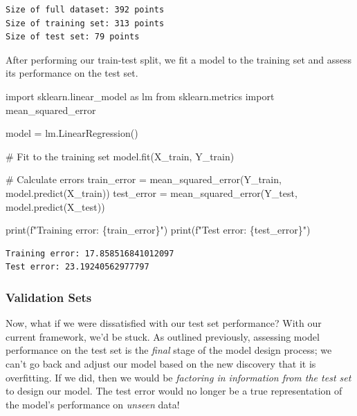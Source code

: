 \documentclass[
  letterpaper,
  DIV=11,
  numbers=noendperiod]{scrreprt}
\newenvironment{Shaded}{\begin{snugshade}}{\end{snugshade}}
\newcommand{\BuiltInTok}[1]{\textcolor[rgb]{0.00,0.23,0.31}{#1}}
\newcommand{\CommentTok}[1]{\textcolor[rgb]{0.37,0.37,0.37}{#1}}
\newcommand{\ImportTok}[1]{\textcolor[rgb]{0.00,0.46,0.62}{#1}}
\newcommand{\NormalTok}[1]{\textcolor[rgb]{0.00,0.23,0.31}{#1}}
\newcommand{\OperatorTok}[1]{\textcolor[rgb]{0.37,0.37,0.37}{#1}}
\newcommand{\SpecialCharTok}[1]{\textcolor[rgb]{0.37,0.37,0.37}{#1}}
\newcommand{\SpecialStringTok}[1]{\textcolor[rgb]{0.13,0.47,0.30}{#1}}
\begin{document}
\begin{verbatim}
Size of full dataset: 392 points
Size of training set: 313 points
Size of test set: 79 points
\end{verbatim}

After performing our train-test split, we fit a model to the training
set and assess its performance on the test set.

\begin{Shaded}
\begin{Highlighting}[]
\ImportTok{import}\NormalTok{ sklearn.linear\_model }\ImportTok{as}\NormalTok{ lm}
\ImportTok{from}\NormalTok{ sklearn.metrics }\ImportTok{import}\NormalTok{ mean\_squared\_error}

\NormalTok{model }\OperatorTok{=}\NormalTok{ lm.LinearRegression()}

\CommentTok{\# Fit to the training set}
\NormalTok{model.fit(X\_train, Y\_train)}

\CommentTok{\# Calculate errors}
\NormalTok{train\_error }\OperatorTok{=}\NormalTok{ mean\_squared\_error(Y\_train, model.predict(X\_train))}
\NormalTok{test\_error }\OperatorTok{=}\NormalTok{ mean\_squared\_error(Y\_test, model.predict(X\_test))}

\BuiltInTok{print}\NormalTok{(}\SpecialStringTok{f"Training error: }\SpecialCharTok{\{}\NormalTok{train\_error}\SpecialCharTok{\}}\SpecialStringTok{"}\NormalTok{)}
\BuiltInTok{print}\NormalTok{(}\SpecialStringTok{f"Test error: }\SpecialCharTok{\{}\NormalTok{test\_error}\SpecialCharTok{\}}\SpecialStringTok{"}\NormalTok{)}
\end{Highlighting}
\end{Shaded}

\begin{verbatim}
Training error: 17.858516841012097
Test error: 23.19240562977797
\end{verbatim}

\subsubsection{Validation Sets}\label{validation-sets}

Now, what if we were dissatisfied with our test set performance? With
our current framework, we'd be stuck. As outlined previously, assessing
model performance on the test set is the \emph{final} stage of the model
design process; we can't go back and adjust our model based on the new
discovery that it is overfitting. If we did, then we would be
\emph{factoring in information from the test set} to design our model.
The test error would no longer be a true representation of the model's
performance on \emph{unseen} data!
\end{document}
